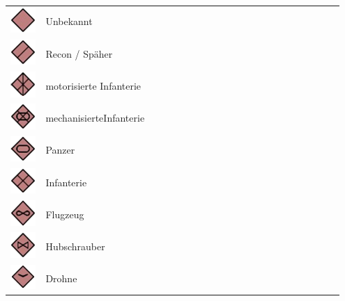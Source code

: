 \begin{longtable}{C{0.1\linewidth} m{0.85\linewidth}}
	\includegraphics[scale=0.8]{../img/advanced/kartenarbeit/unbekannt}	& 	Unbekannt \\
	\includegraphics[scale=0.8]{../img/advanced/kartenarbeit/recon}	& 	Recon / Späher \\
	\includegraphics[scale=0.8]{../img/advanced/kartenarbeit/motorisierte_infanterie}	& 	motorisierte Infanterie \\
	\includegraphics[scale=0.8]{../img/advanced/kartenarbeit/mechanisierte_infanterie}	& 	mechanisierteInfanterie\\
	\includegraphics[scale=0.8]{../img/advanced/kartenarbeit/panzer}	& 	Panzer \\
	\includegraphics[scale=0.8]{../img/advanced/kartenarbeit/infanterie}	& 	Infanterie \\
	\includegraphics[scale=0.8]{../img/advanced/kartenarbeit/flugzeug}	& 	Flugzeug \\
	\includegraphics[scale=0.8]{../img/advanced/kartenarbeit/hubschrauber}	&	 Hubschrauber \\
	\includegraphics[scale=0.8]{../img/advanced/kartenarbeit/drohne}	& 	Drohne \\
\end{longtable}